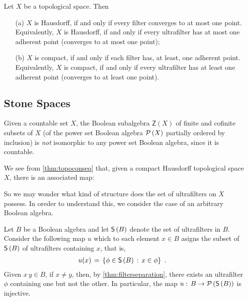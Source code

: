 \begin{coroTopoConseq}\label{thm:topoconseq}
	Let $X$ be a topological space. Then
	\begin{itemize}
		\item[(a)] $X$ is Hausdorff, if and only
			if every filter converges to at most one point.
			Equivalently, $X$ is Hausdorff, if and only if every
			ultrafilter has at most one adherent point
			(converges to at most one point);
		\item[(b)] $X$ is compact, if and only if each filter has,
			at least, one adherent point. Equivalently, $X$
			is compact, if and only if every ultrafilter has
			at least one adherent point (converges to at least
			one point).
	\end{itemize}
\end{coroTopoConseq}

\subsection{Stone Spaces}
Given a countable set $X$, the Boolean subalgebra $\mathsf{Z}(X)$ of finite
and cofinite subsets of $X$ (of the power set Boolean algebra $\mathcal{P}\left(X\right)$
partially ordered by inclusion) is \emph{not} isomorphic to any power set
Boolean algebra, since it is countable.

We see from \ref{thm:topoconseq} that, given a compact Hausdorff topological
space $X$, there is an associated map:
\begin{center}
\end{center}
So we may wonder what kind of structure does the set of ultrafilters on $X$
possess. In oreder to understand this, we consider the case of an arbitrary
Boolean algebra.

Let $B$ be a Boolean algebra and let $\mathsf{S}\left(B\right)$ denote the set of
ultrafilters in $B$. Consider the following map $u$ which to each element
$x\in B$ asigns the subset of $\mathsf{S}\left(B\right)$ of ultrafilters containing $x$,
that is,
\begin{equation}
	\label{eq:boolpowsetiso}
	\begin{aligned}
		u(x) & \,=\,\left\lbrace\phi\in\mathsf{S}\left(B\right)
			\,:\,x\in\phi\right\rbrace
		\text{ .}
	\end{aligned}
\end{equation}
%
Given $x\,y\in B$, if $x\not = y$, then, by \ref{thm:filterseparation},
there exists an ultrafilter $\phi$ containing one but not the other. In
particular, the map $u:\,B\rightarrow\mathcal{P}\left(\mathsf{S}\left(B\right)\right)$ is injective.

